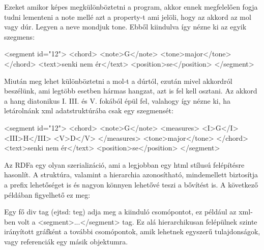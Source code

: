 Ezeket amikor képes megkülönböztetni a program, akkor ennek megfelelően fogja tudni lementeni a note mellé azt a property-t ami jelöli, hogy az akkord az mol vagy dúr. Legyen a neve mondjuk tone. Ebből kiindulva így nézne ki az egyik szegmens:
\begin{xml}
<segment id="12">
   <chord>
      <note>G</note>
      <tone>major</tone>
   </chord>
   <text>senki nem ér</text>
   <position>se</position>
</segment>
\end{xml}

Miután meg lehet különböztetni a mol-t a dúrtól, ezután mivel akkordról beszélünk, ami legtöbb esetben hármas hangzat, azt is fel kell osztani. Az akkord a hang diatonikus I. III. és V. fokából épül fel, valahogy így nézne ki, ha letárolnánk xml adatstruktúrába csak egy szegmensét:
\begin{xml}
<segment id="12">
   <chord>
      <note>G</note>
      <measures>
         <I>G</I>
         <III>H</III>
         <V>D</V>
      </measures>
      <tone>major</tone>
   </chord>
   <text>senki nem ér</text>
   <position>se</position>
</segment>
\end{xml}



\cite{rdfa_with_example}
Az RDFa egy olyan szerializáció, ami a legjobban egy html stílusú felépítésre hasonlít. A struktúra, valamint a hierarchia azonosítható, mindemellett biztosítja a prefix lehetőséget is és nagyon könnyen lehetővé teszi a bővítést is. A következő példában figyelhető ez meg:


Egy fő div tag (ejtsd: teg) adja meg a kiinduló csomópontot, ez például az xml-ben volt a <segment>...</segment> tag. Ez alá hierarchikusan felépülnek szinte irányított gráfként a további csomópontok, amik lehetnek egyszerű tulajdonságok, vagy referenciák egy másik objektumra.

